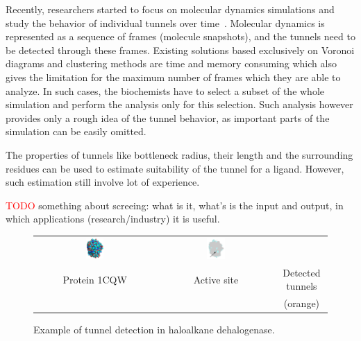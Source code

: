 \documentclass{svmult}
\newcommand{\red}[1]{\textcolor{red}{#1}}
\begin{document}
Recently, researchers started to focus on molecular dynamics simulations and study the behavior of individual tunnels over time~\cite{yaffe2008,caver3,sehnal2013mole}.
Molecular dynamics is represented as a sequence of frames (molecule snapshots), and the tunnels need to be detected through these frames.
Existing solutions based exclusively on Voronoi diagrams and clustering methods are time and memory consuming
which also gives the limitation for the maximum number of frames which they are able to analyze.
In such cases, the biochemists have to select a subset of the whole simulation and perform the analysis only for this selection.
Such analysis however provides only a rough idea of the tunnel behavior, as important parts of the simulation can be easily omitted.

The properties of tunnels like bottleneck radius, their length and the surrounding residues can be used
to estimate suitability of the tunnel for a ligand.
However, such estimation still involve lot of experience.

\red{TODO}
something about screeing: what is it, what's is the input and output, in which applications (research/industry) it is useful.



\begin{figure}[t]
\centering
{\footnotesize
\renewcommand{\arraystretch}{0.1}
\renewcommand{\tabcolsep}{0pt}
\begin{tabular}{ccc}
\includegraphics[width=0.15\textwidth]{fig/motiv1} &
\includegraphics[width=0.17\textwidth]{fig/motiv2lab} \\
Protein 1CQW & Active site & Detected tunnels \\
             &            & (orange)
\end{tabular}
}
\caption{\label{fig::motiv}
    Example of tunnel detection in haloalkane dehalogenase.
}
\end{figure}
\end{document}
